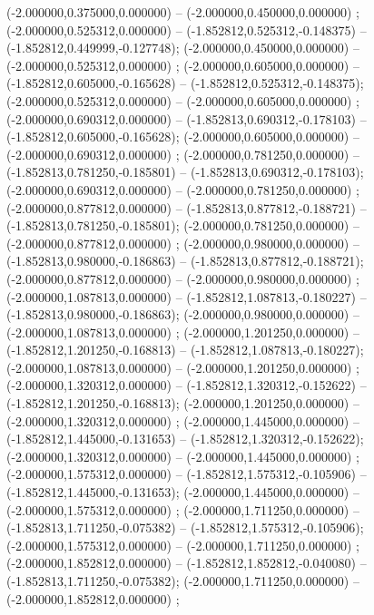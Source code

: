  (-2.000000,0.375000,0.000000) -- (-2.000000,0.450000,0.000000) ;
 (-2.000000,0.525312,0.000000) -- (-1.852812,0.525312,-0.148375) -- (-1.852812,0.449999,-0.127748);
 (-2.000000,0.450000,0.000000) -- (-2.000000,0.525312,0.000000) ;
 (-2.000000,0.605000,0.000000) -- (-1.852812,0.605000,-0.165628) -- (-1.852812,0.525312,-0.148375);
 (-2.000000,0.525312,0.000000) -- (-2.000000,0.605000,0.000000) ;
 (-2.000000,0.690312,0.000000) -- (-1.852813,0.690312,-0.178103) -- (-1.852812,0.605000,-0.165628);
 (-2.000000,0.605000,0.000000) -- (-2.000000,0.690312,0.000000) ;
 (-2.000000,0.781250,0.000000) -- (-1.852813,0.781250,-0.185801) -- (-1.852813,0.690312,-0.178103);
 (-2.000000,0.690312,0.000000) -- (-2.000000,0.781250,0.000000) ;
 (-2.000000,0.877812,0.000000) -- (-1.852813,0.877812,-0.188721) -- (-1.852813,0.781250,-0.185801);
 (-2.000000,0.781250,0.000000) -- (-2.000000,0.877812,0.000000) ;
 (-2.000000,0.980000,0.000000) -- (-1.852813,0.980000,-0.186863) -- (-1.852813,0.877812,-0.188721);
 (-2.000000,0.877812,0.000000) -- (-2.000000,0.980000,0.000000) ;
 (-2.000000,1.087813,0.000000) -- (-1.852812,1.087813,-0.180227) -- (-1.852813,0.980000,-0.186863);
 (-2.000000,0.980000,0.000000) -- (-2.000000,1.087813,0.000000) ;
 (-2.000000,1.201250,0.000000) -- (-1.852812,1.201250,-0.168813) -- (-1.852812,1.087813,-0.180227);
 (-2.000000,1.087813,0.000000) -- (-2.000000,1.201250,0.000000) ;
 (-2.000000,1.320312,0.000000) -- (-1.852812,1.320312,-0.152622) -- (-1.852812,1.201250,-0.168813);
 (-2.000000,1.201250,0.000000) -- (-2.000000,1.320312,0.000000) ;
 (-2.000000,1.445000,0.000000) -- (-1.852812,1.445000,-0.131653) -- (-1.852812,1.320312,-0.152622);
 (-2.000000,1.320312,0.000000) -- (-2.000000,1.445000,0.000000) ;
 (-2.000000,1.575312,0.000000) -- (-1.852812,1.575312,-0.105906) -- (-1.852812,1.445000,-0.131653);
 (-2.000000,1.445000,0.000000) -- (-2.000000,1.575312,0.000000) ;
 (-2.000000,1.711250,0.000000) -- (-1.852813,1.711250,-0.075382) -- (-1.852812,1.575312,-0.105906);
 (-2.000000,1.575312,0.000000) -- (-2.000000,1.711250,0.000000) ;
 (-2.000000,1.852812,0.000000) -- (-1.852812,1.852812,-0.040080) -- (-1.852813,1.711250,-0.075382);
 (-2.000000,1.711250,0.000000) -- (-2.000000,1.852812,0.000000) ;
